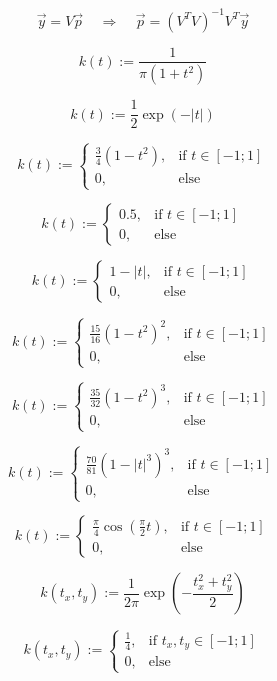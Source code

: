 \documentclass{article}
\begin{document}
\[ \vec{y}=V\vec{p}\ \ \ \ \ \Rightarrow\ \ \ \ \ \vec{p}=(V^TV)^{-1}V^T\vec{y} \]
\pagebreak

\[ k(t):=\frac{1}{\pi(1+t^2)} \]
\pagebreak

\[ k(t):=\frac{1}{2}\exp(-|t|) \]
\pagebreak

\[ k(t) :=\begin{cases}\frac{3}{4} ( 1- t^2 ), & \text{if }t\in [-1;1]\\0, & \text{else}\end{cases} \]
\pagebreak

\[ k(t) :=\begin{cases}0.5, & \text{if }t\in [-1;1]\\0, & \text{else}\end{cases} \]
\pagebreak

\[ k(t) :=\begin{cases}1-|t|, & \text{if }t\in [-1;1]\\0, & \text{else}\end{cases} \]
\pagebreak

\[ k(t) :=\begin{cases}\frac{15}{16}(1-t^2)^2, & \text{if }t\in [-1;1]\\0, & \text{else}\end{cases} \]
\pagebreak

\[ k(t) :=\begin{cases}\frac{35}{32}(1-t^2)^3, & \text{if }t\in [-1;1]\\0, & \text{else}\end{cases} \]
\pagebreak

\[ k(t) :=\begin{cases}\frac{70}{81}(1-|t|^3)^3, & \text{if }t\in [-1;1]\\0, & \text{else}\end{cases} \]
\pagebreak

\[ k(t) :=\begin{cases}\frac{\pi}{4}\cos\left(\frac{\pi}{2}t\right), & \text{if }t\in [-1;1]\\0, & \text{else}\end{cases} \]
\pagebreak

\[ k(t_x, t_y):=\frac{1}{2\pi}\exp \left(-\frac{t_x^2+t_y^2}{2}\right) \]
\pagebreak

\[ k(t_x, t_y):=\begin{cases}\frac{1}{4}, & \text{if }t_x,t_y\in [-1;1]\\0, & \text{else}\end{cases} \]
\pagebreak
\end{document}
